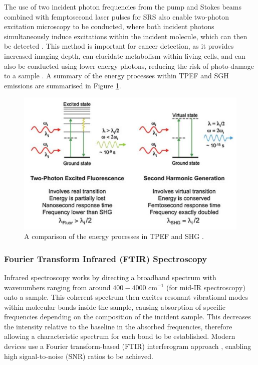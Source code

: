 The use of two incident photon frequencies from the pump and Stokes beams combined with femptosecond laser pulses for SRS also enable two-photon excitation microscopy to be conducted, where both incident photons simultaneously induce excitations within the incident molecule, which can then be detected \cite{denk_two-photon_1990}. This method is important for cancer detection, as it provides increased imaging depth, can elucidate metabolism within living cells, and can also be conducted using lower energy photons, reducing the risk of photo-damage to a sample \cite{perry_two-photon_2012}. A summary of the energy processes within TPEF and SGH emissions are summarised in Figure \ref{fig:tpef_shg_energies}.
\begin{figure}
    \centering
    \includegraphics[width=1\linewidth]{Images/nihms-365614-f0001.jpg}
    \caption{A comparison of the energy processes in TPEF and SHG \cite{perry_two-photon_2012}.}
    \label{fig:tpef_shg_energies}
\end{figure}

\subsubsection{Fourier Transform Infrared (FTIR) Spectroscopy}
Infrared spectroscopy works by directing a broadband spectrum with wavenumbers ranging from around $400-4000 \text{ cm}^{-1}$  (for mid-IR spectroscopy) \cite{su_fourier_2020} onto a sample. This coherent spectrum then excites resonant vibrational modes within molecular bonds inside the sample, causing absorption of specific frequencies depending on the composition of the incident sample. This decreases the intensity relative to the baseline in the absorbed frequencies, therefore allowing a characteristic spectrum for each bond to be established. Modern devices use a Fourier transform-based (FTIR) interferogram approach \cite{griffiths_fourier_1983}, enabling high signal-to-noise (SNR) ratios to be achieved.\\

